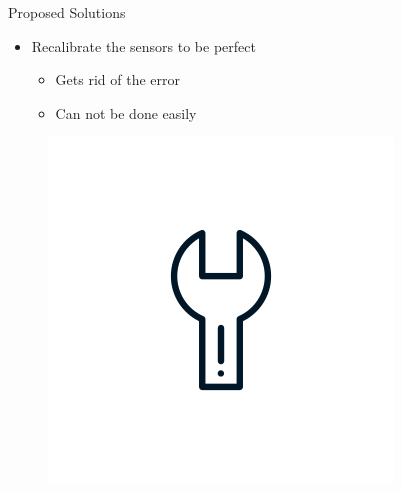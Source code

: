 \documentclass[aspectratio=169]{beamer}
[aspectratio=169] %
\begin{document}
\begin{frame}{Proposed Solutions}
  \begin{minipage}{0.49\textwidth} 
    \begin{itemize}
      \item Recalibrate the sensors to be perfect
      \begin{itemize}
        \item Gets rid of the error
        \item Can not be done easily
      \end{itemize}
    \end{itemize}
  \end{minipage}
  \hfill
  \begin{minipage}{0.49\textwidth} 
    \begin{figure}
      \centering
      \includegraphics[height=0.5\textheight]{figures/tool.png}
    \end{figure}
  \end{minipage}
\end{frame}
\end{document}
